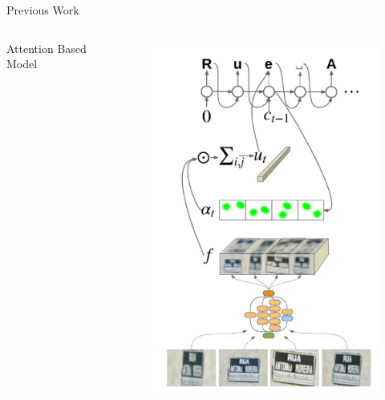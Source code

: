 \documentclass[compress]{beamer}
\begin{document}
\begin{frame}[allowframebreaks]{Previous Work}
\begin{columns}
\begin{column}[T]{.5\textwidth}
\begin{block}{Attention Based Model}
            \end{block}
        \end{column}
        \begin{column}[T]{.5\textwidth}
            \begin{figure}
                \includegraphics[width=.8\textwidth]{attention_model}
            \end{figure}
        \end{column}
    \end{columns}
\end{frame}
\end{document}
